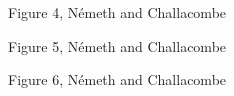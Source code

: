 \documentclass[prl,twocolumn,showpacs,twocolumngrid,superbib]{revtex4}
\begin{document}
{\clearpage

\begin{center}
Figure 4, N{\'e}meth and Challacombe \\[1.cm]
\end{center}

\clearpage

\begin{center}
Figure 5, N{\'e}meth and Challacombe \\[1.cm]
\end{center}

\clearpage

\begin{center}
Figure 6, N{\'e}meth and Challacombe \\[1.cm]
\end{center}

}
\end{document}
